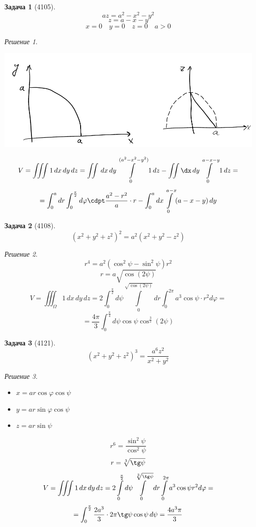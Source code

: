 \documentclass[english]{article}
\theoremstyle{plain}
\theoremstyle{remark}
\newtheorem*{solution}{Решение}
\theoremstyle{definition}
\newtheorem{task}{Задача}
\begin{document}
\begin{task}[4105]
\[ az = a^2 - x^2 - y^2 \]
\[ z = a - x - y \]
\[ x=0\quad y = 0\quad z = 0\quad a>0 \]
\end{task}
\begin{solution}
\-
\begin{center}
\includegraphics[scale=0.3]{8_2.png}
\end{center}
\[ V = \iiint 1\,dx\,dy\,dz = \iint \,dx\,dy \int\limits_0^{(a^2 - x^2 - y^2)}1\,dz - \iint\dx\,dy \int\limits_0^{a - x - y} 1\,dz = \]
\[ = \int_0^a dr \int_0^{\frac{\pi}{2}} d\varphi \cdpt\frac{a^2 - r^2}{a}\cdot r - \int_0^adx\int\limits_0^{a - x}(a - x - y)\,dy \]
\end{solution}

\begin{task}[4108]
\[ (x^2 + y^2 + z^2)^2 = a^2(x^2 + y^2 - z^2) \]
\end{task}
\begin{solution}
\[ r^4 = a^2(\cos^2\psi - \sin^2\psi)r^2 \]
\[ r = a\sqrt{\cos(2\psi)} \]
\[ V = \iiint_\Omega 1\,dx\,dy\,dz = 2\int_0^{\frac{\pi}{2}} d\psi \int\limits_0^{\sqrt{\cos(2\psi)}}dr \int_0^{2\pi} a^3\cos\psi \cdot r^2d\varphi =  \]
\[ = \frac{4\pi}{3}\int_0^{\frac{\pi}{4}} d\psi \cos\psi\cos^{\frac{3}{2}}(2\psi) \]
\end{solution}

\begin{task}[4121]
\[ (x^2 + y^2 + z^2)^3 = \frac{a^6 z^2}{x^2 + y^2} \]
\end{task}
\begin{solution}
\-
\begin{itemize}
\item \(x = ar\cos\varphi\cos\psi\)
\item \(y = ar\sin\varphi\cos\psi\)
\item \(z = ar\sin\psi\)
\end{itemize}
\[ r^6 = \frac{\sin^2\psi}{\cos^2\psi} \]
\[ r = \sqrt[3]{\tg\psi} \]
\[ V = \iiint 1\,dx\,dy\,dz = 2\int\limits_0^{\frac{\pi}{2}}d\psi\int\limits_0^{\sqrt[3]{\tg\psi}}dr\int\limits_0^{2\pi}a^3 \cos\psi r^2 d\varphi = \]
\[ = \int_0^{\frac{\pi}{2}} \frac{2a^3}{3}\cdot 2\pi \tg\psi \cos\psi\,d\psi = \frac{4a^3\pi}{3} \]
\end{solution}
\end{document}

